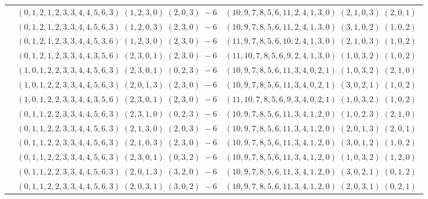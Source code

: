 \documentclass[11pt]{article}
\begin{document}
\begin{longtable}[l]{|c|c|c|}
 \cline{2-3} 
 & $(0 ,1 ,2 ,1 ,2 ,3 ,3 ,4 ,4 ,5 ,6 ,3) \;(1 ,2 ,3 ,0) \;(2 ,0 ,3) \;-6$ & $(10 ,9 ,7 ,8 ,5 ,6 ,11 ,2 ,4 ,1 ,3 ,0) \;(2 ,1 ,0 ,3) \;(2 ,0 ,1) \;$\\ 
 \cline{2-3} 
 & $(0 ,1 ,2 ,1 ,2 ,3 ,3 ,4 ,4 ,5 ,6 ,3) \;(1 ,2 ,0 ,3) \;(2 ,3 ,0) \;-6$ & $(10 ,9 ,7 ,8 ,5 ,6 ,11 ,2 ,4 ,1 ,3 ,0) \;(3 ,1 ,0 ,2) \;(1 ,0 ,2) \;$\\ 
 \cline{2-3} 
 & $(0 ,1 ,2 ,1 ,2 ,3 ,3 ,4 ,4 ,5 ,3 ,6) \;(1 ,2 ,3 ,0) \;(2 ,3 ,0) \;-6$ & $(11 ,9 ,7 ,8 ,5 ,6 ,10 ,2 ,4 ,1 ,3 ,0) \;(2 ,1 ,0 ,3) \;(1 ,0 ,2) \;$\\ 
 \cline{2-3} 
 & $(0 ,1 ,2 ,1 ,2 ,3 ,3 ,4 ,4 ,3 ,5 ,6) \;(2 ,3 ,0 ,1) \;(2 ,3 ,0) \;-6$ & $(11 ,10 ,7 ,8 ,5 ,6 ,9 ,2 ,4 ,1 ,3 ,0) \;(1 ,0 ,3 ,2) \;(1 ,0 ,2) \;$\\ 
 \cline{2-3} 
 & $(1 ,0 ,1 ,2 ,2 ,3 ,3 ,4 ,4 ,5 ,6 ,3) \;(2 ,3 ,0 ,1) \;(0 ,2 ,3) \;-6$ & $(10 ,9 ,7 ,8 ,5 ,6 ,11 ,3 ,4 ,0 ,2 ,1) \;(1 ,0 ,3 ,2) \;(2 ,1 ,0) \;$\\ 
 \cline{2-3} 
 & $(1 ,0 ,1 ,2 ,2 ,3 ,3 ,4 ,4 ,5 ,6 ,3) \;(2 ,0 ,1 ,3) \;(2 ,3 ,0) \;-6$ & $(10 ,9 ,7 ,8 ,5 ,6 ,11 ,3 ,4 ,0 ,2 ,1) \;(3 ,0 ,2 ,1) \;(1 ,0 ,2) \;$\\ 
 \cline{2-3} 
 & $(1 ,0 ,1 ,2 ,2 ,3 ,3 ,4 ,4 ,3 ,5 ,6) \;(2 ,3 ,0 ,1) \;(2 ,3 ,0) \;-6$ & $(11 ,10 ,7 ,8 ,5 ,6 ,9 ,3 ,4 ,0 ,2 ,1) \;(1 ,0 ,3 ,2) \;(1 ,0 ,2) \;$\\ 
 \cline{2-3} 
 & $(0 ,1 ,1 ,2 ,2 ,3 ,3 ,4 ,4 ,5 ,6 ,3) \;(2 ,3 ,1 ,0) \;(0 ,2 ,3) \;-6$ & $(10 ,9 ,7 ,8 ,5 ,6 ,11 ,3 ,4 ,1 ,2 ,0) \;(1 ,0 ,2 ,3) \;(2 ,1 ,0) \;$\\ 
 \cline{2-3} 
 & $(0 ,1 ,1 ,2 ,2 ,3 ,3 ,4 ,4 ,5 ,6 ,3) \;(2 ,1 ,3 ,0) \;(2 ,0 ,3) \;-6$ & $(10 ,9 ,7 ,8 ,5 ,6 ,11 ,3 ,4 ,1 ,2 ,0) \;(2 ,0 ,1 ,3) \;(2 ,0 ,1) \;$\\ 
 \cline{2-3} 
 & $(0 ,1 ,1 ,2 ,2 ,3 ,3 ,4 ,4 ,5 ,6 ,3) \;(2 ,1 ,0 ,3) \;(2 ,3 ,0) \;-6$ & $(10 ,9 ,7 ,8 ,5 ,6 ,11 ,3 ,4 ,1 ,2 ,0) \;(3 ,0 ,1 ,2) \;(1 ,0 ,2) \;$\\ 
 \cline{2-3} 
 & $(0 ,1 ,1 ,2 ,2 ,3 ,3 ,4 ,4 ,5 ,6 ,3) \;(2 ,3 ,0 ,1) \;(0 ,3 ,2) \;-6$ & $(10 ,9 ,7 ,8 ,5 ,6 ,11 ,3 ,4 ,1 ,2 ,0) \;(1 ,0 ,3 ,2) \;(1 ,2 ,0) \;$\\ 
 \cline{2-3} 
 & $(0 ,1 ,1 ,2 ,2 ,3 ,3 ,4 ,4 ,5 ,6 ,3) \;(2 ,0 ,1 ,3) \;(3 ,2 ,0) \;-6$ & $(10 ,9 ,7 ,8 ,5 ,6 ,11 ,3 ,4 ,1 ,2 ,0) \;(3 ,0 ,2 ,1) \;(0 ,1 ,2) \;$\\ 
 \cline{2-3} 
 & $(0 ,1 ,1 ,2 ,2 ,3 ,3 ,4 ,4 ,5 ,6 ,3) \;(2 ,0 ,3 ,1) \;(3 ,0 ,2) \;-6$ & $(10 ,9 ,7 ,8 ,5 ,6 ,11 ,3 ,4 ,1 ,2 ,0) \;(2 ,0 ,3 ,1) \;(0 ,2 ,1) \;$\\ 

\end{longtable}
\end{document}
